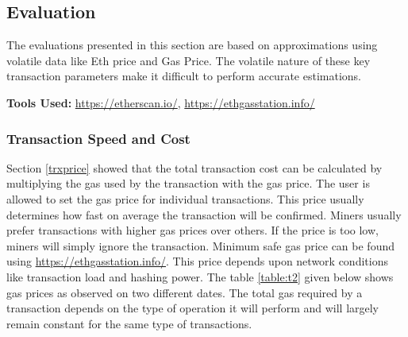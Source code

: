 \subsection{Evaluation}
The evaluations presented in this section are based on approximations using volatile data like Eth price and Gas Price. The volatile nature of these key transaction parameters make it difficult to perform accurate estimations.

\textbf{Tools Used:} \url{https://etherscan.io/}, \url{https://ethgasstation.info/}
\vspace{0.5cm}
\subsubsection{Transaction Speed and Cost} \label{TrxCost} 
Section \ref{trxprice} showed that the total transaction cost can be calculated by multiplying the gas used by the transaction with the gas price. The user is allowed to set the gas price for individual transactions. This price usually determines how fast on average the transaction will be confirmed. Miners usually prefer transactions with higher gas prices over others. If the price is too low, miners will simply ignore the transaction. Minimum safe gas price can be found using \url{https://ethgasstation.info/}. This price depends upon network conditions like transaction load and hashing power. The table \ref{table:t2} given below shows gas prices as observed on two different dates. The total gas required by a transaction depends on the type of operation it will perform and will largely remain constant for the same type of transactions.
\vspace{1mm}
